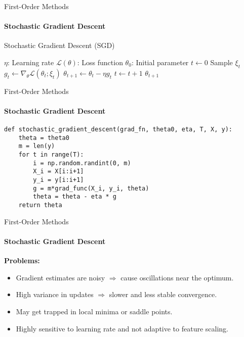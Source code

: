 \documentclass{beamer}
\begin{document}
\begin{frame}{First-Order Methods}
\framesubtitle{Stochastic Gradient Descent}
\small
\begin{algorithm}[H]
\caption{Stochastic Gradient Descent (SGD)}
\begin{algorithmic}[1]
\Require $\eta$: Learning rate
\Require $\mathcal{L}(\theta)$: Loss function
\Require $\theta_0$: Initial parameter
\State $t \gets 0$
    \State Sample $\xi_t$ 
    \State $g_t \gets \nabla_\theta \mathcal{L}(\theta_t; \xi_t)$ 
    \State $\theta_{t+1} \gets \theta_t - \eta g_t$ 
    \State $t \gets t + 1$
\EndWhile
\State \Return $\theta_{t+1}$
\end{algorithmic}
\end{algorithm}
\end{frame}


\begin{frame}[fragile]{First-Order Methods}
\framesubtitle{Stochastic Gradient Descent}
\begin{verbatim}
def stochastic_gradient_descent(grad_fn, theta0, eta, T, X, y):
    theta = theta0
    m = len(y)
    for t in range(T):
        i = np.random.randint(0, m)
        X_i = X[i:i+1]  
        y_i = y[i:i+1]
        g = m*grad_func(X_i, y_i, theta)
        theta = theta - eta * g
    return theta
\end{verbatim}
\end{frame}

\begin{frame}[fragile]{First-Order Methods}
\framesubtitle{Stochastic Gradient Descent}
\textbf{Problems:}
\begin{itemize}
    \item Gradient estimates are noisy $\Rightarrow$ cause oscillations near the optimum.
    \item High variance in updates $\Rightarrow$ slower and less stable convergence.
    \item May get trapped in local minima or saddle points.
    \item Highly sensitive to learning rate and not adaptive to feature scaling.
\end{itemize}
\end{frame}
\end{document}
